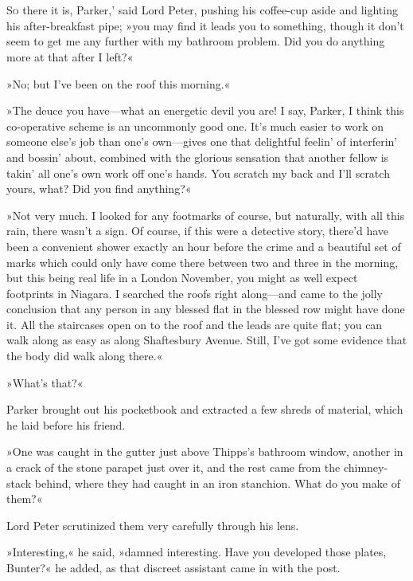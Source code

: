 \chapter[Chapter \thechapter]{}
\lettrine[lines=4,ante=‘—]{S}{o} there it is, Parker,' said Lord Peter, pushing his coffee-cup aside and lighting his after-breakfast pipe; »you may find it leads you to something, though it don't seem to get me any further with my bathroom problem. Did you do anything more at that after I left?«

»No; but I've been on the roof this morning.«

»The deuce you have—what an energetic devil you are! I say, Parker, I think this co-operative scheme is an uncommonly good one. It's much easier to work on someone else's job than one's own—gives one that delightful feelin' of interferin' and bossin' about, combined with the glorious sensation that another fellow is takin' all one's own work off one's hands. You scratch my back and I'll scratch yours, what? Did you find anything?«

»Not very much. I looked for any footmarks of course, but naturally, with all this rain, there wasn't a sign. Of course, if this were a detective story, there'd have been a convenient shower exactly an hour before the crime and a beautiful set of marks which could only have come there between two and three in the morning, but this being real life in a London November, you might as well expect footprints in Niagara. I searched the roofs right along—and came to the jolly conclusion that any person in any blessed flat in the blessed row might have done it. All the staircases open on to the roof and the leads are quite flat; you can walk along as easy as along Shaftesbury Avenue. Still, I've got some evidence that the body did walk along there.«

»What's that?«

Parker brought out his pocketbook and extracted a few shreds of material, which he laid before his friend.

»One was caught in the gutter just above Thipps's bathroom window, another in a crack of the stone parapet just over it, and the rest came from the chimney-stack behind, where they had caught in an iron stanchion. What do you make of them?«

Lord Peter scrutinized them very carefully through his lens.

»Interesting,« he said, »damned interesting. Have you developed those plates, Bunter?« he added, as that discreet assistant came in with the post.

